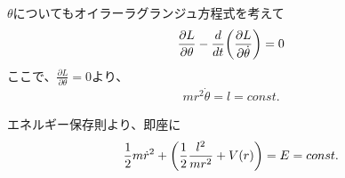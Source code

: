 \documentclass[dvipdfmx]{report} %
\begin{document}
\begin{tcolorbox}
$\theta$についてもオイラーラグランジュ方程式を考えて\\
$$
\frac{ \partial L }{ \partial \theta } - \frac{d}{dt} \biggl{(} \frac{\partial L}{\partial \dot{\theta}}  \biggr{)} = 0
$$
ここで、$\frac{ \partial L }{ \partial \theta } = 0$より、
\begin{eqnarray}
	mr^2\dot{ \theta } = l = const.
\end{eqnarray}
\end{tcolorbox}
\begin{tcolorbox}
エネルギー保存則より、即座に
\begin{eqnarray}
	\frac{1}{2} m \dot{r}^2 + \biggl{(} \frac{1}{2} \frac{l^2}{mr^2} + V(r) \biggr{)} = E = const.
\end{eqnarray}
\end{tcolorbox}
\end{document}
